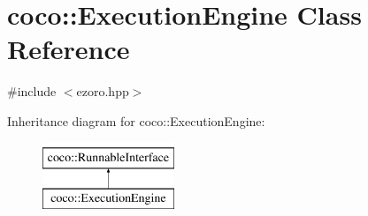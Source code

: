 \hypertarget{classcoco_1_1_execution_engine}{\section{coco\-:\-:Execution\-Engine Class Reference}
\label{classcoco_1_1_execution_engine}
}


{\ttfamily \#include $<$ezoro.\-hpp$>$}

Inheritance diagram for coco\-:\-:Execution\-Engine\-:\begin{figure}[H]
\begin{center}
\leavevmode
\includegraphics[height=2.000000cm]{classcoco_1_1_execution_engine}
\end{center}
\end{figure}
